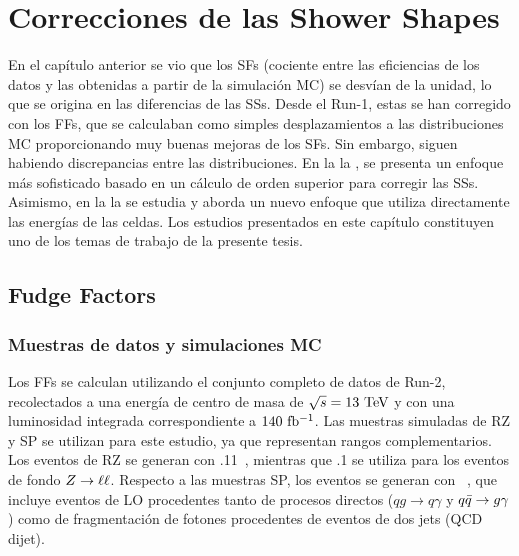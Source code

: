 \chapter{Correcciones de las Shower Shapes}
\label{ch:ss_corrections}


En el capítulo anterior se vio que los \acp{SF} (cociente entre las eficiencias de los datos y las obtenidas a partir de la simulaci\'on \ac{MC}) se desvían de la unidad, lo que se origina en las diferencias de las \acfp{SS}. Desde el Run-1, estas se han corregido con los \acfp{FF}, que se calculaban como simples desplazamientos a las distribuciones \ac{MC} proporcionando muy buenas mejoras de los \acp{SF}. Sin embargo, siguen habiendo discrepancias entre las distribuciones.
En la la \Sect{\ref{sec:ss_corrections:ffs}}, se presenta un enfoque más sofisticado basado en un cálculo de orden superior para corregir las \acp{SS}. Asimismo, en la la \Sect{\ref{sec:ss_corrections:cell_rw}} se estudia y aborda un nuevo enfoque que utiliza directamente las energías de las celdas. Los estudios presentados en este capítulo constituyen uno de los temas de trabajo de la presente tesis.





\section{Fudge Factors}
\label{sec:ss_corrections:ffs}


\subsection{Muestras de datos y simulaciones MC}
\label{subsec:ss_corrections:ffs:samples}

Los \acp{FF} se calculan utilizando el conjunto completo de datos de Run-2, recolectados a una energ\'ia de centro de masa de \(\sqrt{s}=13~\tev\) y con una luminosidad integrada correspondiente a \(140~\ifb\).
Las muestras simuladas de \ac{RZ} y \ac{SP} se utilizan para este estudio, ya que representan rangos \pt complementarios. Los eventos de \ac{RZ} se generan con .11~\cite{Sherpa2.2}, mientras que .1 se utiliza para los eventos de fondo \(\Zboson \to \ell\ell\). Respecto a las muestras \ac{SP}, los eventos se generan con ~\cite{Pythia8.1}, que incluye eventos \gammajet de \acf{LO} procedentes tanto de procesos directos (\(qg\to q\gamma\) y \(\qqbar \to g \gamma\)) como de fragmentación de fotones procedentes de eventos de dos jets (\ac{QCD} dijet).

